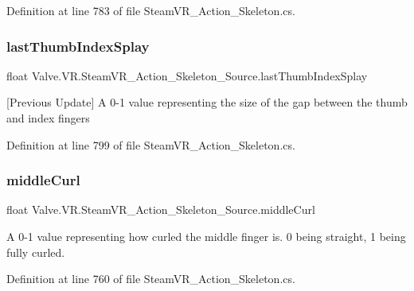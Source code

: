 Definition at line 783 of file Steam\+V\+R\+\_\+\+Action\+\_\+\+Skeleton.\+cs.

\mbox{\label{class_valve_1_1_v_r_1_1_steam_v_r___action___skeleton___source_a765af83dcfd5cfa898e0ada7c94afeee}} 
\subsubsection{\texorpdfstring{lastThumbIndexSplay}{lastThumbIndexSplay}}
{\footnotesize\ttfamily float Valve.\+V\+R.\+Steam\+V\+R\+\_\+\+Action\+\_\+\+Skeleton\+\_\+\+Source.\+last\+Thumb\+Index\+Splay\hspace{0.3cm}{\ttfamily [get]}}



\mbox{[}Previous Update\mbox{]} A 0-\/1 value representing the size of the gap between the thumb and index fingers 



Definition at line 799 of file Steam\+V\+R\+\_\+\+Action\+\_\+\+Skeleton.\+cs.

\mbox{\label{class_valve_1_1_v_r_1_1_steam_v_r___action___skeleton___source_a5be1629291d3e36faa1db01c239cb482}} 
\subsubsection{\texorpdfstring{middleCurl}{middleCurl}}
{\footnotesize\ttfamily float Valve.\+V\+R.\+Steam\+V\+R\+\_\+\+Action\+\_\+\+Skeleton\+\_\+\+Source.\+middle\+Curl\hspace{0.3cm}{\ttfamily [get]}}



A 0-\/1 value representing how curled the middle finger is. 0 being straight, 1 being fully curled. 



Definition at line 760 of file Steam\+V\+R\+\_\+\+Action\+\_\+\+Skeleton.\+cs.

